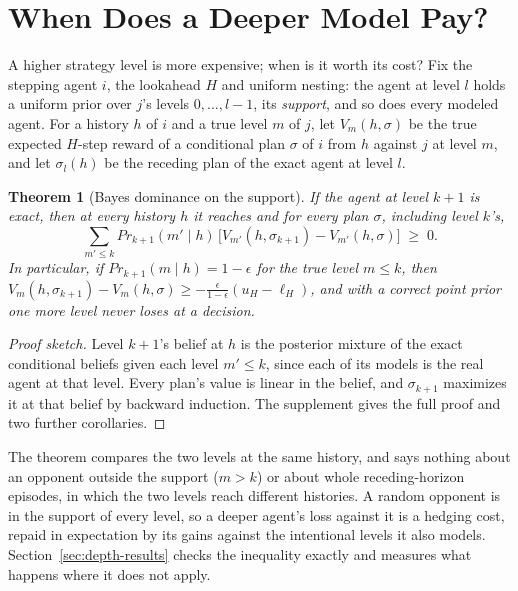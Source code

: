\documentclass{article}
\newtheorem{theorem}{Theorem}
\renewcommand{\Pr}{\mathit{Pr}}
\begin{document}
\section{When Does a Deeper Model Pay?}
\label{sec:depth}

A higher strategy level is more expensive; when is it worth its cost? Fix the stepping agent $i$, the lookahead $H$ and uniform nesting: the agent at level $l$ holds a uniform prior over $j$'s levels $0, \ldots, l-1$, its \emph{support}, and so does every modeled agent. For a history $h$ of $i$ and a true level $m$ of $j$, let $V_m(h, \sigma)$ be the true expected $H$-step reward of a conditional plan $\sigma$ of $i$ from $h$ against $j$ at level $m$, and let $\sigma_l(h)$ be the receding plan of the exact agent at level $l$.

\begin{theorem}[Bayes dominance on the support]
\label{prop:prediction}
If the agent at level $k+1$ is exact, then at every history $h$ it reaches and for every plan $\sigma$, including level $k$'s,
\[
\textstyle\sum_{m' \leq k} \Pr_{k+1}(m' \mid h)\, \big[V_{m'}(h, \sigma_{k+1}) - V_{m'}(h, \sigma)\big] \;\geq\; 0.
\]
In particular, if $\Pr_{k+1}(m \mid h) = 1 - \epsilon$ for the true level $m \leq k$, then $V_m(h, \sigma_{k+1}) - V_m(h, \sigma) \geq -\frac{\epsilon}{1 - \epsilon}(u_H - \ell_H)$, and with a correct point prior one more level never loses at a decision.
\end{theorem}
\begin{proof}[Proof sketch]
Level $k+1$'s belief at $h$ is the posterior mixture of the exact conditional beliefs given each level $m' \leq k$, since each of its models is the real agent at that level. Every plan's value is linear in the belief, and $\sigma_{k+1}$ maximizes it at that belief by backward induction. The supplement gives the full proof and two further corollaries.
\end{proof}

The theorem compares the two levels at the same history, and says nothing about an opponent outside the support ($m > k$) or about whole receding-horizon episodes, in which the two levels reach different histories. A random opponent is in the support of every level, so a deeper agent's loss against it is a hedging cost, repaid in expectation by its gains against the intentional levels it also models. Section~\ref{sec:depth-results} checks the inequality exactly and measures what happens where it does not apply.
\end{document}
